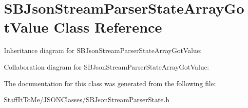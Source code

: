 \hypertarget{interface_s_b_json_stream_parser_state_array_got_value}{
\section{\-S\-B\-Json\-Stream\-Parser\-State\-Array\-Got\-Value \-Class \-Reference}
\label{interface_s_b_json_stream_parser_state_array_got_value}
}


\-Inheritance diagram for \-S\-B\-Json\-Stream\-Parser\-State\-Array\-Got\-Value\-:


\-Collaboration diagram for \-S\-B\-Json\-Stream\-Parser\-State\-Array\-Got\-Value\-:


\-The documentation for this class was generated from the following file\-:\begin{DoxyCompactItemize}
\item 
\-Staff\-It\-To\-Me/\-J\-S\-O\-N\-Classes/\-S\-B\-Json\-Stream\-Parser\-State.\-h\end{DoxyCompactItemize}
